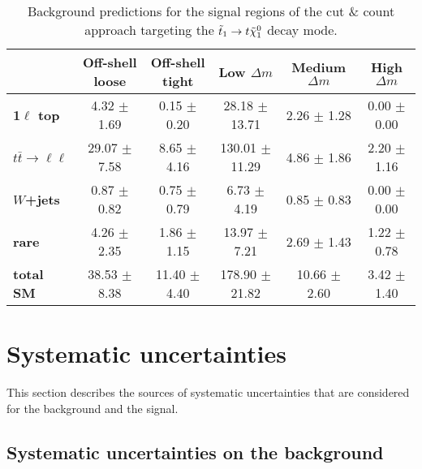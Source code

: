         \begin{table}[!ht]
            \begin{center}
                { \footnotesize
                \begin{tabular}{|l|ccccc|}
                    \hline
                    &
                    \textbf{Off-shell loose}    &
                    \textbf{Off-shell tight}    &
                    \textbf{Low $\Delta m$}     &
                    \textbf{Medium $\Delta m$}  &
                    \textbf{High $\Delta m$}    \\
                    \hline
                    \textbf{1$\ell$ top}     & 4.32 $\pm$ 1.69   & 0.15 $\pm$ 0.20   & 28.18 $\pm$ 13.71     & 2.26 $\pm$ 1.28   & 0.00 $\pm$ 0.00   \\
                    \textbf{$t\bar{t} \rightarrow \ell \ell$}    & 29.07 $\pm$ 7.58      & 8.65 $\pm$ 4.16   & 130.01 $\pm$ 11.29    & 4.86 $\pm$ 1.86   & 2.20 $\pm$ 1.16   \\
                    \textbf{$W$+jets}    & 0.87 $\pm$ 0.82   & 0.75 $\pm$ 0.79   & 6.73 $\pm$ 4.19   & 0.85 $\pm$ 0.83   & 0.00 $\pm$ 0.00   \\
                    \textbf{rare}    & 4.26 $\pm$ 2.35   & 1.86 $\pm$ 1.15   & 13.97 $\pm$ 7.21      & 2.69 $\pm$ 1.43   & 1.22 $\pm$ 0.78   \\
                    \textbf{total SM}    & 38.53 $\pm$ 8.38      & 11.40 $\pm$ 4.40      & 178.90 $\pm$ 21.82    & 10.66 $\pm$ 2.60      & 3.42 $\pm$ 1.40   \\
                    \hline
                \end{tabular}
                }
                \caption{Background predictions for the signal regions of the cut \& count approach targeting the $\tilde{t}_1 \rightarrow t \tilde{\chi}_1^0$ decay mode.}
                \label{tab:report_yield_CnC_T2tt}
            \end{center}
        \end{table}


    \section{Systematic uncertainties \label{sec:analysis_systematics}}

        This section describes the sources of systematic uncertainties that are considered for the background and the signal.

        \subsection{Systematic uncertainties on the background \label{sec:background_systematics}}

